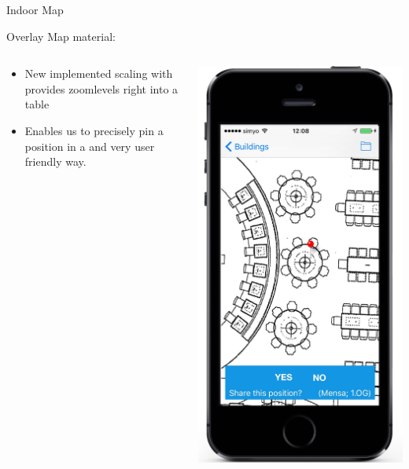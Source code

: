 \documentclass[11pt]{beamer}
\begin{document}
\begin{frame}{Indoor Map}

Overlay Map material:

  \begin{columns}[T]
  \begin{column}{.6\textwidth}
  \begin{itemize}
    \item New implemented scaling with provides zoomlevels right into a table
    \item Enables us to precisely pin a position in a and very user friendly way.
  \end{itemize}
  \end{column}
  \begin{column}{.4\textwidth}
  \includegraphics[scale=0.25]{mappinpointa}
  \end{column}
\end{columns}

\end{frame}
\end{document}
